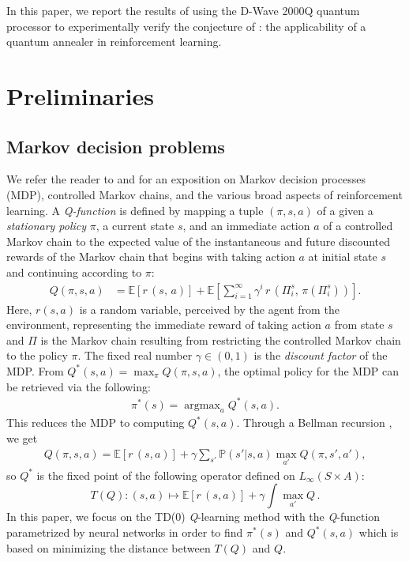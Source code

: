 \documentclass[pra,twocolumn,floatfix,superscriptaddress]{revtex4}
\DeclareMathOperator{\argmax}{argmax}
\begin{document}
In this paper, we report the results of using the D-Wave 2000Q quantum processor to experimentally verify the conjecture of \cite{2016arXiv161205695C}: the applicability of a quantum annealer in reinforcement learning. 

\section{Preliminaries} 

\subsection{Markov decision problems}\label{sec:MDP}

We refer the reader to \cite{sutton-book} and \cite{Yuksel} for an exposition on Markov decision processes (MDP), controlled Markov chains, and the various broad aspects of reinforcement learning. A \emph{Q-function} is defined by mapping a tuple $(\pi, s, a)$ of a given a \emph{stationary policy} $\pi$, a current state $s$, and an immediate action $a$ of a controlled Markov chain to the expected value of the instantaneous and future discounted rewards of the Markov chain that begins with taking action $a$ at initial state $s$ and continuing according to $\pi$: 
\begin{align*} 
Q (\pi, s, a) &= \mathbb E[ r\, (s,\, a)] + \mathbb{E} \left[ \sum\limits_{i=1}^{\infty} \gamma^{i}\, r\, (\Pi^s_{i},\, \pi(\Pi^s_{i})) \right].
\end{align*}
Here, $r(s, a)$ is a random variable, perceived by the agent from the environment, representing the immediate reward of taking action $a$ from state $s$ and $\Pi$ is the Markov chain resulting from restricting the controlled Markov chain to the policy $\pi$. The fixed real number $\gamma \in (0, 1)$ is the \emph{discount factor} of the MDP. From $Q^\ast(s, a)= \max_\pi Q(\pi, s, a)$, the optimal policy for the MDP can be retrieved via the following:
\begin{align}\label{eq:policy-from-Q}
\pi^\ast (s) = \argmax_a Q^\ast (s, a).
\end{align}
This reduces the MDP to computing $Q^\ast (s, a)$. 
Through a Bellman recursion \cite{bellman1956dynamic}, we get  
\begin{align}\label{contraction-mapping}
Q(\pi, s, a) = \mathbb E[r\, (s, a) ] + \gamma \sum_{s'} \mathbb P(s' | s, a) \max_{a'} Q (\pi, s', a'),
\end{align}
so $Q^\ast$ is the fixed point of the following operator defined on $L_\infty (S \times A)$:
$$T(Q): (s, a) \mapsto \mathbb E[ r\, (s, a)] + \gamma \int \max_{a'} Q\,.$$
In this paper, we focus on the TD(0) \emph{Q}-learning method with the \emph{Q}-function parametrized by neural networks in order to find $\pi^\ast (s)$ and $Q^\ast (s, a)$ which is based on minimizing the distance between $T(Q)$ and $Q$.
\end{document}
